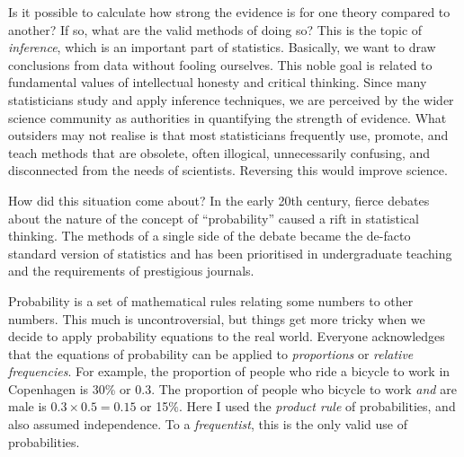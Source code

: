 \documentclass[a4paper, 12pt]{article}
\begin{document}

Is it possible to calculate how strong the evidence is for one theory compared
to another? If so, what are the valid methods of doing so? This is the topic
of {\em inference}, which is an important part of statistics.
Basically, we want to
draw conclusions from data without fooling ourselves. This noble goal
is related to fundamental values of intellectual honesty and critical
thinking.
Since many statisticians study and apply inference techniques,
we are perceived by the wider science community as authorities
in quantifying the strength of evidence. What outsiders may not realise is
that most statisticians frequently use, promote, and teach methods that are
obsolete, often illogical, unnecessarily confusing, and disconnected from the
needs of scientists.  Reversing this would improve science.

How did this situation come about?
In the early 20th century, fierce debates about the
nature of the concept of ``probability'' caused a rift in statistical thinking.
The methods of a single side of the debate became the
de-facto standard version of statistics and has been prioritised in undergraduate
teaching and the requirements of prestigious journals.

Probability is a set of mathematical rules relating some
numbers to other numbers. This much is uncontroversial, but things get more
tricky when we decide to apply probability equations to the real
world. Everyone acknowledges that the equations of probability can be applied
to {\em proportions} or {\em relative frequencies}. For example, the proportion
of people who ride a bicycle to work in Copenhagen is 30\% or 0.3.
The proportion of people who bicycle to work {\em and} are male is
$0.3 \times 0.5 = 0.15$ or 15$\%$. Here I used the {\em product rule} of
probabilities, and also assumed independence.
To a {\em frequentist}, this is the only valid use of probabilities.
\end{document}
